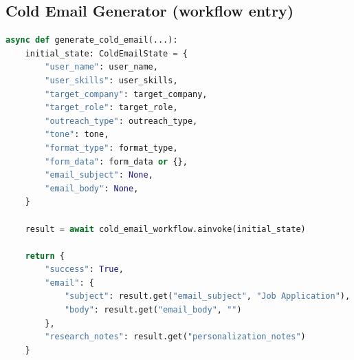 \subsection{Cold Email Generator (workflow entry)}
\begin{lstlisting}[style=codebox,language=Python]
async def generate_cold_email(...):
    initial_state: ColdEmailState = {
        "user_name": user_name,
        "user_skills": user_skills,
        "target_company": target_company,
        "target_role": target_role,
        "outreach_type": outreach_type,
        "tone": tone,
        "format_type": format_type,
        "form_data": form_data or {},
        "email_subject": None,
        "email_body": None,
    }

    result = await cold_email_workflow.ainvoke(initial_state)

    return {
        "success": True,
        "email": {
            "subject": result.get("email_subject", "Job Application"),
            "body": result.get("email_body", "")
        },
        "research_notes": result.get("personalization_notes")
    }
\end{lstlisting}

